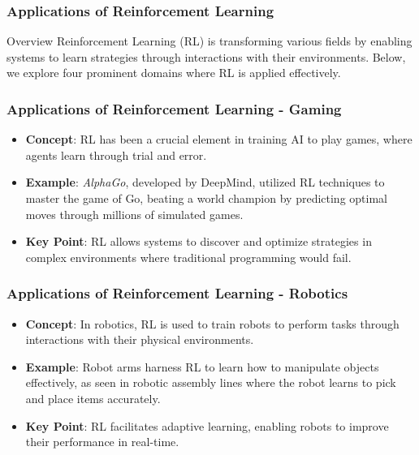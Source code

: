 \documentclass[aspectratio=169]{beamer}
\begin{document}
\begin{frame}[fragile]
    \frametitle{Applications of Reinforcement Learning}
    
    \begin{block}{Overview}
        Reinforcement Learning (RL) is transforming various fields by enabling systems to learn strategies through interactions with their environments. Below, we explore four prominent domains where RL is applied effectively.
    \end{block}
\end{frame}

\begin{frame}[fragile]
    \frametitle{Applications of Reinforcement Learning - Gaming}

    \begin{itemize}
        \item \textbf{Concept}: 
        RL has been a crucial element in training AI to play games, where agents learn through trial and error.
        
        \item \textbf{Example}: 
        \textit{AlphaGo}, developed by DeepMind, utilized RL techniques to master the game of Go, beating a world champion by predicting optimal moves through millions of simulated games.
        
        \item \textbf{Key Point}: 
        RL allows systems to discover and optimize strategies in complex environments where traditional programming would fail.
    \end{itemize}
\end{frame}

\begin{frame}[fragile]
    \frametitle{Applications of Reinforcement Learning - Robotics}

    \begin{itemize}
        \item \textbf{Concept}: 
        In robotics, RL is used to train robots to perform tasks through interactions with their physical environments.
        
        \item \textbf{Example}: 
        Robot arms harness RL to learn how to manipulate objects effectively, as seen in robotic assembly lines where the robot learns to pick and place items accurately.
        
        \item \textbf{Key Point}: 
        RL facilitates adaptive learning, enabling robots to improve their performance in real-time.
    \end{itemize}
\end{frame}
\end{document}
